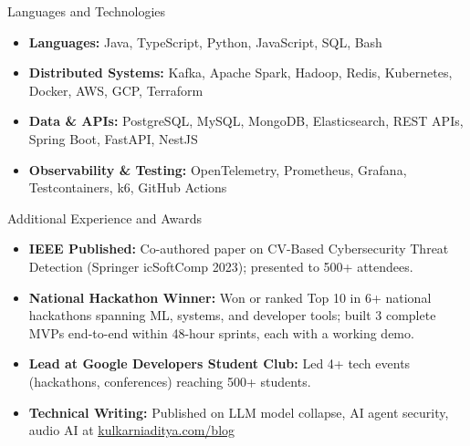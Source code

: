 \documentclass[]{mcdowellcv}
\begin{document}
\begin{cvsection}{Languages and Technologies}
  \begin{cvsubsection}{}{}{}
    \begin{itemize}
      \item \textbf{Languages:} Java, TypeScript, Python, JavaScript, SQL, Bash
      \item \textbf{Distributed Systems:} Kafka, Apache Spark, Hadoop, Redis, Kubernetes, Docker, AWS, GCP, Terraform
      \item \textbf{Data \& APIs:} PostgreSQL, MySQL, MongoDB, Elasticsearch, REST APIs, Spring Boot, FastAPI, NestJS
      \item \textbf{Observability \& Testing:} OpenTelemetry, Prometheus, Grafana, Testcontainers, k6, GitHub Actions
    \end{itemize}
  \end{cvsubsection}
\end{cvsection}

\begin{cvsection}{Additional Experience and Awards}
  \begin{cvsubsection}{}{}{}
    \begin{itemize}
      \item \textbf{IEEE Published:} Co-authored paper on CV-Based Cybersecurity Threat Detection (Springer icSoftComp 2023); presented to 500+ attendees.
      \item \textbf{National Hackathon Winner:} Won or ranked Top 10 in 6+ national hackathons spanning ML, systems, and developer tools; built 3 complete MVPs end-to-end within 48-hour sprints, each with a working demo.
      \item \textbf{Lead at Google Developers Student Club:} Led 4+ tech events (hackathons, conferences) reaching 500+ students.
      \item \textbf{Technical Writing:} Published on LLM model collapse, AI agent security, audio AI at \href{https://www.kulkarniaditya.com/blog}{kulkarniaditya.com/blog}
    \end{itemize}
  \end{cvsubsection}
\end{cvsection}
\end{document}
